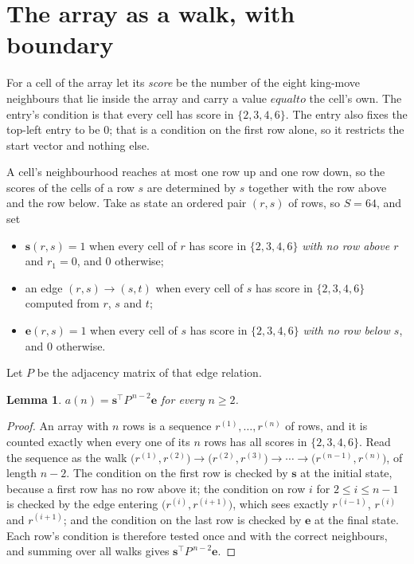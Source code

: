 \documentclass[11pt,a4paper]{article}
\theoremstyle{plain}
\newtheorem{lemma}[theorem]{Lemma}
\theoremstyle{definition}
\begin{document}
\section{The array as a walk, with boundary}

For a cell of the array let its \emph{score} be the number of the eight king-move neighbours that lie inside
the array and carry a value $equal to$ the cell's own. The entry's condition is that every cell
has score in $\{2,3,4,6\}$. The entry also fixes the top-left entry to be $0$; that is a condition on the first row alone, so it restricts the start vector and nothing else.

A cell's neighbourhood reaches at most one row up and one row down, so the scores of the
cells of a row $s$ are determined by $s$ together with the row above and the row below.
Take as state an ordered pair $(r,s)$ of rows, so $S=64$, and set
\begin{itemize}
\item $\mathbf{s}(r,s)=1$ when every cell of $r$ has score in $\{2,3,4,6\}$ \emph{with no row
above $r$} and $r_1=0$, and $0$ otherwise;
\item an edge $(r,s)\to(s,t)$ when every cell of $s$ has score in $\{2,3,4,6\}$ computed from
$r$, $s$ and $t$;
\item $\mathbf{e}(r,s)=1$ when every cell of $s$ has score in $\{2,3,4,6\}$ \emph{with no row
below $s$}, and $0$ otherwise.
\end{itemize}
Let $P$ be the adjacency matrix of that edge relation.

\begin{lemma}\label{lem:walk}
$a(n)=\mathbf{s}^{\!\top}P^{\,n-2}\mathbf{e}$ for every $n\ge2$.
\end{lemma}

\begin{proof}
An array with $n$ rows is a sequence $r^{(1)},\dots,r^{(n)}$ of rows, and it is counted
exactly when every one of its $n$ rows has all scores in $\{2,3,4,6\}$. Read the sequence as the
walk $\bigl(r^{(1)},r^{(2)}\bigr)\to\bigl(r^{(2)},r^{(3)}\bigr)\to\cdots\to
\bigl(r^{(n-1)},r^{(n)}\bigr)$, of length $n-2$. The condition on the first row is
checked by $\mathbf{s}$ at the initial state, because a first row has no row above it; the
condition on row $i$ for $2\le i\le n-1$ is checked by the edge entering
$\bigl(r^{(i)},r^{(i+1)}\bigr)$, which sees exactly $r^{(i-1)}$, $r^{(i)}$ and
$r^{(i+1)}$; and the condition on the last row is checked by $\mathbf{e}$ at the final
state. Each row's condition is therefore tested once and with the correct neighbours, and
summing over all walks gives $\mathbf{s}^{\!\top}P^{\,n-2}\mathbf{e}$.
\end{proof}
\end{document}
